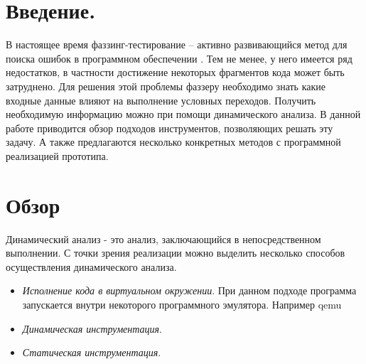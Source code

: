 \section{Введение.}

В настоящее время фаззинг-тестирование -- активно развивающийся метод для поиска ошибок в программном обеспечении \cite{DBLP:journals/corr/abs-1808-09700}. Тем не менее, у него имеется ряд недостатков, в частности достижение некоторых фрагментов кода может быть затруднено. Для решения этой проблемы фаззеру необходимо знать какие входные данные влияют на выполнение условных переходов. Получить необходимую информацию можно при помощи динамического анализа. В данной работе приводится обзор подходов инструментов, позволяющих решать эту задачу. А также предлагаются несколько конкретных методов с программной реализацией прототипа.


\section{Обзор}

Динамический анализ - это анализ, заключающийся в непосредственном выполнении. С точки зрения реализации можно выделить несколько способов осуществления динамического анализа.

\begin{itemize}
\item {\em Исполнение кода в виртуальном окружении}. При данном подходе программа запускается внутри некоторого программного эмулятора. Например qemu \cite{QEMU}

\item {\em Динамическая инструментация}.

\item {\em Статическая инструментация}.

\end{itemize}


